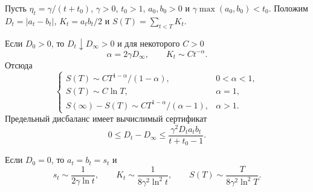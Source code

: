 \begin{theorem}
\label{thm:factorized}
Пусть $\eta_t=\gamma/(t+t_0)$, $\gamma>0$, $t_0>1$,
$a_0,b_0>0$ и $\gamma\max(a_0,b_0)<t_0$.
Положим $D_t=|a_t-b_t|$, $K_t=a_tb_t/2$ и $S(T)=\sum_{t<T}K_t$.

Если $D_0>0$, то $D_t\downarrow D_\infty>0$ и для некоторого $C>0$
\begin{equation}
 \alpha=2\gamma D_\infty,\qquad K_t\sim Ct^{-\alpha}.
 \label{eq:power-risk}
\end{equation}
Отсюда
\begin{equation}
 \begin{cases}
 S(T)\sim C T^{1-\alpha}/(1-\alpha),&0<\alpha<1,\\
 S(T)\sim C\ln T,&\alpha=1,\\
 S(\infty)-S(T)\sim C T^{1-\alpha}/(\alpha-1),&\alpha>1.
 \end{cases}
 \label{eq:sum-regimes}
\end{equation}
Предельный дисбаланс имеет вычислимый сертификат
\begin{equation}
 0\le D_t-D_\infty
 \le\frac{\gamma^2D_ta_tb_t}{t+t_0-1}.
 \label{eq:imbalance-certificate}
\end{equation}

Если $D_0=0$, то $a_t=b_t=s_t$ и
\begin{equation}
 s_t\sim\frac1{2\gamma\ln t},\qquad
 K_t\sim\frac1{8\gamma^2\ln^2t},\qquad
 S(T)\sim\frac{T}{8\gamma^2\ln^2T}.
 \label{eq:balanced}
\end{equation}
\end{theorem}
